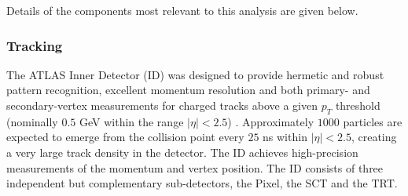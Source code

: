 \documentclass[12pt, twoside]{article}
\numberwithin{equation}{section}
\numberwithin{figure}{section}
\begin{document}
Details of the components most relevant to this analysis are given below.

\subsubsection{Tracking}
\label{subsubsec:Tracking}

The ATLAS Inner Detector (ID) was designed to provide hermetic and robust pattern recognition, excellent momentum resolution and both primary- and secondary-vertex measurements for charged tracks above a given $p_{T}$ threshold (nominally $0.5$ GeV within the range $|\eta| < 2.5$) \cite{tracking}. Approximately $1000$ particles are expected to emerge from the collision point every $25$ ns within $|\eta| < 2.5$, creating a very large track density in the detector. The ID achieves high-precision measurements of the momentum and vertex position. The ID consists of three independent but complementary sub-detectors, the Pixel, the SCT and the TRT.
\end{document}
